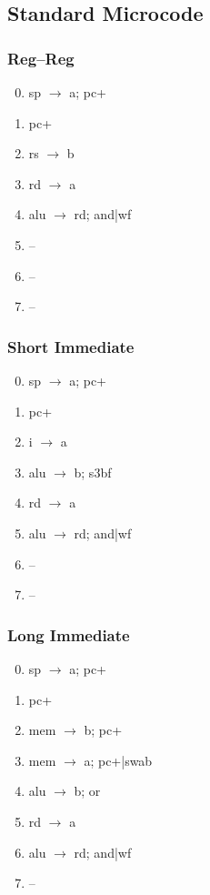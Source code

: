 \documentclass[11pt]{book}
\begin{document}
\subsection*{Standard Microcode}
\begin{multicols}{3}\ttfamily\selectfont\small
  \subsubsection*{Reg--Reg}
  \begin{enumerate}\setcounter{enumi}{-1}
  \item sp \(\rightarrow\) a; pc+
  \item pc+
  \item rs \(\rightarrow\) b
  \item rd \(\rightarrow\) a
  \item alu \(\rightarrow\) rd; and|wf
  \item --
  \item --
  \item --
  \end{enumerate}
  \columnbreak
  \subsubsection*{Short Immediate}
  \begin{enumerate}\setcounter{enumi}{-1}
  \item sp \(\rightarrow\) a; pc+
  \item pc+
  \item i \(\rightarrow\) a
  \item alu \(\rightarrow\) b; s3bf
  \item rd \(\rightarrow\) a
  \item alu \(\rightarrow\) rd; and|wf
  \item --
  \item --
  \end{enumerate}
  \columnbreak
  \subsubsection*{Long Immediate}
  \begin{enumerate}\setcounter{enumi}{-1}
  \item sp \(\rightarrow\) a; pc+
  \item pc+
  \item mem \(\rightarrow\) b; pc+
  \item mem \(\rightarrow\) a; pc+|swab
  \item alu \(\rightarrow\) b; or
  \item rd \(\rightarrow\) a
  \item alu \(\rightarrow\) rd; and|wf
  \item --
  \end{enumerate}
\end{multicols}
\end{document}
